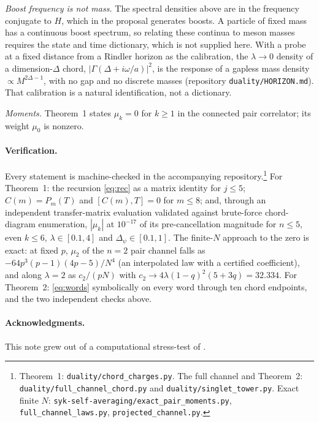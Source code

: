 \documentclass[11pt]{article}
\begin{document}
\emph{Boost frequency is not mass.} The spectral densities above are in
the frequency conjugate to $H$, which in the proposal generates boosts.
A particle of fixed mass has a continuous boost spectrum, so relating
these continua to meson masses requires the state and time dictionary,
which is not supplied here. With a probe at a fixed distance from a
Rindler horizon as the calibration, the $\lambda\to0$ density of a
dimension-$\Delta$ chord, $|\Gamma(\Delta+i\omega/a)|^2$, is the response
of a gapless mass density $\propto M^{2\Delta-1}$, with no gap and no
discrete masses (repository \texttt{duality/HORIZON.md}). That
calibration is a natural identification, not a dictionary.

\emph{Moments.} Theorem~1 states $\mu_k=0$ for $k\ge1$ in the connected
pair correlator; its weight $\mu_0$ is nonzero.

\paragraph{Verification.}
Every statement is machine-checked in the accompanying
repository.\footnote{Theorem~1: \texttt{duality/chord\_charges.py}.
The full channel and Theorem~2: \texttt{duality/full\_channel\_chord.py}
and \texttt{duality/singlet\_tower.py}. Exact finite $N$:
\texttt{syk-self-averaging/exact\_pair\_moments.py},
\texttt{full\_channel\_laws.py}, \texttt{projected\_channel.py}.} For
Theorem~1: the recursion \eqref{eq:rec} as a matrix identity for
$j\le5$; $C(m)=P_m(T)$ and $[C(m),T]=0$ for $m\le8$; and, through an
independent transfer-matrix evaluation validated against brute-force
chord-diagram enumeration, $|\mu_k|$ at $10^{-17}$ of its
pre-cancellation magnitude for $n\le5$, even $k\le6$,
$\lambda\in[0.1,4]$ and $\Delta_\psi\in[0.1,1]$. The finite-$N$ approach
to the zero is exact: at fixed $p$, $\mu_2$ of the $n=2$ pair channel
falls as $-64p^3(p-1)(4p-5)/N^4$ (an interpolated law with a certified
coefficient), and along $\lambda=2$ as $c_2/(pN)$ with
$c_2\to4\lambda(1-q)^2(5+3q)=32.334$. For Theorem~2: \eqref{eq:words}
symbolically on every word through ten chord endpoints, and the two
independent checks above.

\paragraph{Acknowledgments.}
This note grew out of a computational stress-test of \cite{MSS2607}.
\end{document}
